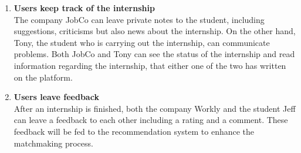 \begin{enumerate}
            \item \textbf{Users keep track of the internship }
            \\ The company JobCo can leave private notes to the student, including suggestions, criticisms but also news about the internship. On the other hand, Tony, the student who is carrying out the internship, can communicate problems. Both JobCo and Tony can see the status of the internship and read information regarding the internship, that either one of the two has written on the platform.


            \item \textbf{Users leave feedback}
            \\ After an internship is finished, both the company Workly and the student Jeff can leave a feedback to each other including a rating and a comment. These feedback will be fed to the recommendation system to enhance the matchmaking process. 
            
        \end{enumerate}
        
